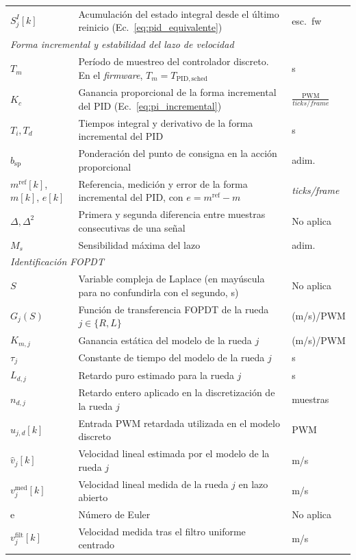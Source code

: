 \begin{appendices}
{\begin{longtable}{p{2.7cm} p{8.5cm} p{2.2cm}}
$S_j^{I}[k]$ & Acumulación del estado integral desde el último reinicio (Ec.~\eqref{eq:pid_equivalente}) & esc.\ fw \\
\multicolumn{3}{l}{\textit{Forma incremental y estabilidad del lazo de velocidad}}\\
$T_m$ & Período de muestreo del controlador discreto. En el \textit{firmware}, $T_m=T_{\mathrm{PID,sched}}$ & s \\
$K_c$ & Ganancia proporcional de la forma incremental del PID (Ec.~\eqref{eq:pi_incremental}) & $\frac{\text{PWM}}{\textit{ticks/frame}}$ \\
$T_i,T_d$ & Tiempos integral y derivativo de la forma incremental del PID & s \\
$b_{\mathrm{sp}}$ & Ponderación del punto de consigna en la acción proporcional & adim. \\
$m^{\mathrm{ref}}[k]$, $m[k]$, $e[k]$ & Referencia, medición y error de la forma incremental del PID, con $e=m^{\mathrm{ref}}-m$ & \textit{ticks/frame} \\
$\Delta,\Delta^{2}$ & Primera y segunda diferencia entre muestras consecutivas de una señal & No aplica \\
$M_s$ & Sensibilidad máxima del lazo & adim. \\
\multicolumn{3}{l}{\textit{Identificación FOPDT}}\\
$S$ & Variable compleja de Laplace (en mayúscula para no confundirla con el segundo, s) & No aplica \\
$G_j(S)$ & Función de transferencia FOPDT de la rueda $j\in\{R,L\}$ & (m/s)/PWM \\
$K_{m,j}$ & Ganancia estática del modelo de la rueda $j$ & (m/s)/PWM \\
$\tau_j$ & Constante de tiempo del modelo de la rueda $j$ & s \\
$L_{d,j}$ & Retardo puro estimado para la rueda $j$ & s \\
$n_{d,j}$ & Retardo entero aplicado en la discretización de la rueda $j$ & muestras \\
$u_{j,d}[k]$ & Entrada PWM retardada utilizada en el modelo discreto & PWM \\
$\hat{v}_j[k]$ & Velocidad lineal estimada por el modelo de la rueda $j$ & m/s \\
$v_j^{\mathrm{med}}[k]$ & Velocidad lineal medida de la rueda $j$ en lazo abierto & m/s \\
$\mathrm{e}$ & Número de Euler & No aplica \\
$v_j^{\mathrm{filt}}[k]$ & Velocidad medida tras el filtro uniforme centrado & m/s \\

\end{longtable}}
\end{appendices}
